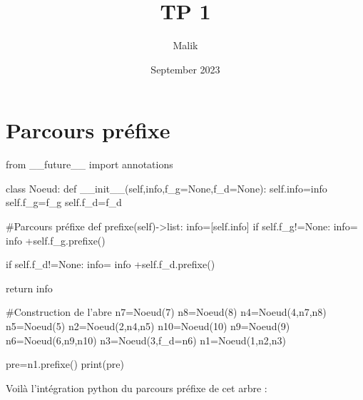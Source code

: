 \documentclass{article}
\title{TP 1}
\author{Malik }
\date{September 2023}
\begin{document}
\maketitle

\section{Parcours préfixe}

\begin{python}
    from __future__ import annotations

    class Noeud:
        def __init__(self,info,f_g=None,f_d=None):
            self.info=info
            self.f_g=f_g
            self.f_d=f_d
            
            #Parcours préfixe
        def prefixe(self)->list:
            info=[self.info]
            if self.f_g!=None:
                info= info +self.f_g.prefixe()
                
            if self.f_d!=None:
                info= info +self.f_d.prefixe()
                
            return info
    
    
    #Construction de l'abre
    n7=Noeud(7)
    n8=Noeud(8)
    n4=Noeud(4,n7,n8)
    n5=Noeud(5)
    n2=Noeud(2,n4,n5)
    n10=Noeud(10)
    n9=Noeud(9)
    n6=Noeud(6,n9,n10)
    n3=Noeud(3,f_d=n6)
    n1=Noeud(1,n2,n3)
    
    
    pre=n1.prefixe()
    print(pre)
\end{python}
Voilà l'intégration python du parcours préfixe de cet arbre : 

    
\end{document}

